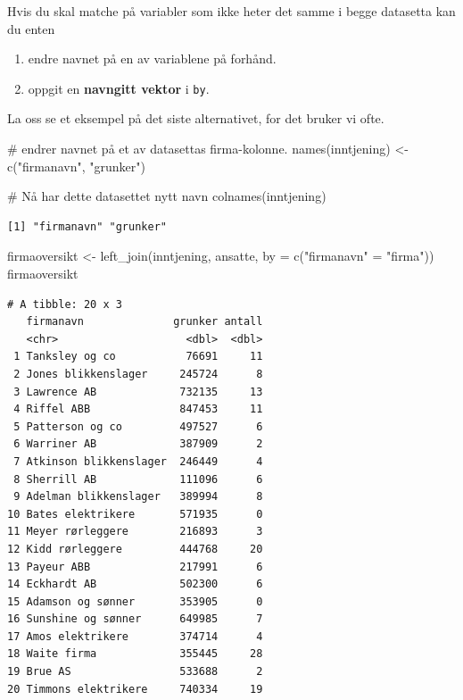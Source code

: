 \documentclass[
  letterpaper,
  DIV=11,
  numbers=noendperiod]{scrreprt}
\newenvironment{Shaded}{\begin{snugshade}}{\end{snugshade}}
\newcommand{\AttributeTok}[1]{\textcolor[rgb]{0.40,0.45,0.13}{#1}}
\newcommand{\CommentTok}[1]{\textcolor[rgb]{0.37,0.37,0.37}{#1}}
\newcommand{\FunctionTok}[1]{\textcolor[rgb]{0.28,0.35,0.67}{#1}}
\newcommand{\NormalTok}[1]{\textcolor[rgb]{0.00,0.23,0.31}{#1}}
\newcommand{\OtherTok}[1]{\textcolor[rgb]{0.00,0.23,0.31}{#1}}
\newcommand{\StringTok}[1]{\textcolor[rgb]{0.13,0.47,0.30}{#1}}
\providecommand{\tightlist}{%
  \setlength{\itemsep}{0pt}\setlength{\parskip}{0pt}}\usepackage{longtable,booktabs,array}
\begin{document}
Hvis du skal matche på variabler som ikke heter det samme i begge
datasetta kan du enten

\begin{enumerate}
\def\labelenumi{\arabic{enumi}.}
\tightlist
\item
  endre navnet på en av variablene på forhånd.
\item
  oppgit en \textbf{navngitt vektor} i \texttt{by}.
\end{enumerate}

La oss se et eksempel på det siste alternativet, for det bruker vi ofte.

\begin{Shaded}
\begin{Highlighting}[]
\CommentTok{\# endrer navnet på et av datasettas firma{-}kolonne.}
\FunctionTok{names}\NormalTok{(inntjening) }\OtherTok{\textless{}{-}} \FunctionTok{c}\NormalTok{(}\StringTok{"firmanavn"}\NormalTok{, }\StringTok{"grunker"}\NormalTok{)}

\CommentTok{\# Nå har dette datasettet nytt navn }
\FunctionTok{colnames}\NormalTok{(inntjening)}
\end{Highlighting}
\end{Shaded}

\begin{verbatim}
[1] "firmanavn" "grunker"  
\end{verbatim}

\begin{Shaded}
\begin{Highlighting}[]
\NormalTok{firmaoversikt }\OtherTok{\textless{}{-}} \FunctionTok{left\_join}\NormalTok{(inntjening, }
\NormalTok{                           ansatte,}
                           \AttributeTok{by =} \FunctionTok{c}\NormalTok{(}\StringTok{"firmanavn"} \OtherTok{=} \StringTok{"firma"}\NormalTok{))}
\NormalTok{firmaoversikt}
\end{Highlighting}
\end{Shaded}

\begin{verbatim}
# A tibble: 20 x 3
   firmanavn              grunker antall
   <chr>                    <dbl>  <dbl>
 1 Tanksley og co           76691     11
 2 Jones blikkenslager     245724      8
 3 Lawrence AB             732135     13
 4 Riffel ABB              847453     11
 5 Patterson og co         497527      6
 6 Warriner AB             387909      2
 7 Atkinson blikkenslager  246449      4
 8 Sherrill AB             111096      6
 9 Adelman blikkenslager   389994      8
10 Bates elektrikere       571935      0
11 Meyer rørleggere        216893      3
12 Kidd rørleggere         444768     20
13 Payeur ABB              217991      6
14 Eckhardt AB             502300      6
15 Adamson og sønner       353905      0
16 Sunshine og sønner      649985      7
17 Amos elektrikere        374714      4
18 Waite firma             355445     28
19 Brue AS                 533688      2
20 Timmons elektrikere     740334     19
\end{verbatim}
\end{document}
